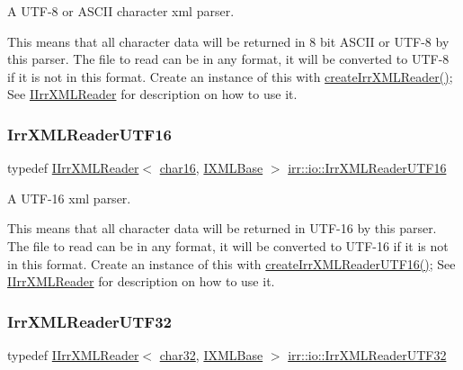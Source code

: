 A U\+T\+F-\/8 or A\+S\+C\+II character xml parser. 

This means that all character data will be returned in 8 bit A\+S\+C\+II or U\+T\+F-\/8 by this parser. The file to read can be in any format, it will be converted to U\+T\+F-\/8 if it is not in this format. Create an instance of this with \hyperlink{namespaceirr_1_1io_a638e38fd4c6d6e40ce4f332be6a3b570}{create\+Irr\+X\+M\+L\+Reader()}; See \hyperlink{classirr_1_1io_1_1IIrrXMLReader}{I\+Irr\+X\+M\+L\+Reader} for description on how to use it. \mbox{\label{namespaceirr_1_1io_a76b498bd6edceb2e2ef91d75585e6bfd}} 
\subsubsection{\texorpdfstring{Irr\+X\+M\+L\+Reader\+U\+T\+F16}{IrrXMLReaderUTF16}}
{\footnotesize\ttfamily typedef \hyperlink{classirr_1_1io_1_1IIrrXMLReader}{I\+Irr\+X\+M\+L\+Reader}$<$ \hyperlink{namespaceirr_1_1io_afcc06f885f299b3df6cacd15fbe0499a}{char16}, \hyperlink{classirr_1_1io_1_1IXMLBase}{I\+X\+M\+L\+Base} $>$ \hyperlink{namespaceirr_1_1io_a76b498bd6edceb2e2ef91d75585e6bfd}{irr\+::io\+::\+Irr\+X\+M\+L\+Reader\+U\+T\+F16}}



A U\+T\+F-\/16 xml parser. 

This means that all character data will be returned in U\+T\+F-\/16 by this parser. The file to read can be in any format, it will be converted to U\+T\+F-\/16 if it is not in this format. Create an instance of this with \hyperlink{namespaceirr_1_1io_a2b7451dc3f1606c80bf46be9ccc955d9}{create\+Irr\+X\+M\+L\+Reader\+U\+T\+F16()}; See \hyperlink{classirr_1_1io_1_1IIrrXMLReader}{I\+Irr\+X\+M\+L\+Reader} for description on how to use it. \mbox{\label{namespaceirr_1_1io_aa596f324a302585d965b1a28c562561b}} 
\subsubsection{\texorpdfstring{Irr\+X\+M\+L\+Reader\+U\+T\+F32}{IrrXMLReaderUTF32}}
{\footnotesize\ttfamily typedef \hyperlink{classirr_1_1io_1_1IIrrXMLReader}{I\+Irr\+X\+M\+L\+Reader}$<$ \hyperlink{namespaceirr_1_1io_ae3a0c616a13e7b98b0f83e187f4f4a60}{char32}, \hyperlink{classirr_1_1io_1_1IXMLBase}{I\+X\+M\+L\+Base} $>$ \hyperlink{namespaceirr_1_1io_aa596f324a302585d965b1a28c562561b}{irr\+::io\+::\+Irr\+X\+M\+L\+Reader\+U\+T\+F32}}




